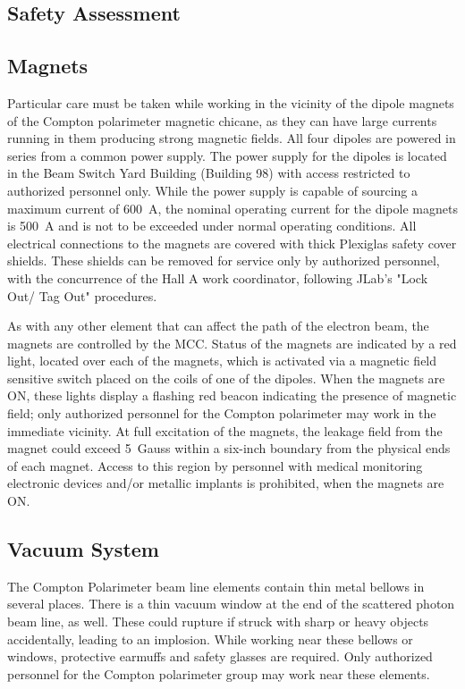 \begin{safetyen}{0}{0}
\section {Safety Assessment}
\label{sec:compton_safety}
\end{safetyen}

\begin{safetyen}{10}{15}
\subsection{Magnets}

Particular care must be taken while working in the vicinity of the dipole magnets of the 
Compton polarimeter magnetic chicane, as they can have large currents
running in them producing strong magnetic fields.  All four dipoles are
powered in series from a common power supply. The power supply for
the dipoles is located in the Beam Switch Yard Building (Building 98) with access restricted to authorized personnel only.
While the power supply  is capable of sourcing  a maximum current of 600~A, the nominal operating current for the dipole magnets is 500~A and is not to be exceeded under normal operating conditions.  All electrical connections to the magnets are covered with thick Plexiglas safety cover shields. These shields can  be removed for service only by authorized personnel, with the concurrence of the Hall A work coordinator, following JLab's "Lock Out/ Tag Out" procedures.

As with any other element that can affect the path of the electron beam, the magnets are controlled by the MCC. Status of the magnets are indicated by a 
red light, located over each of the magnets, which is activated via a magnetic field sensitive switch placed on the coils of one of the dipoles. When the magnets are ON, these lights display a flashing red beacon indicating the presence of magnetic field; only authorized personnel for the Compton polarimeter may  work in the immediate vicinity. At full excitation of the magnets, the leakage field from the magnet could exceed 5~Gauss within a six-inch boundary from the physical ends of each magnet. Access to this region by personnel with  medical monitoring electronic devices and/or metallic implants is prohibited, when the magnets are ON.

\subsection{Vacuum System}
The Compton Polarimeter beam line elements contain thin metal bellows in several places. There is a thin vacuum window at the end of the scattered photon beam line, as well. These could rupture if struck with sharp or heavy objects accidentally, leading to an implosion.  While working near these bellows or windows, protective earmuffs and safety  glasses are required. Only authorized personnel for the Compton polarimeter group may  work near these elements. 


\end{safetyen}
